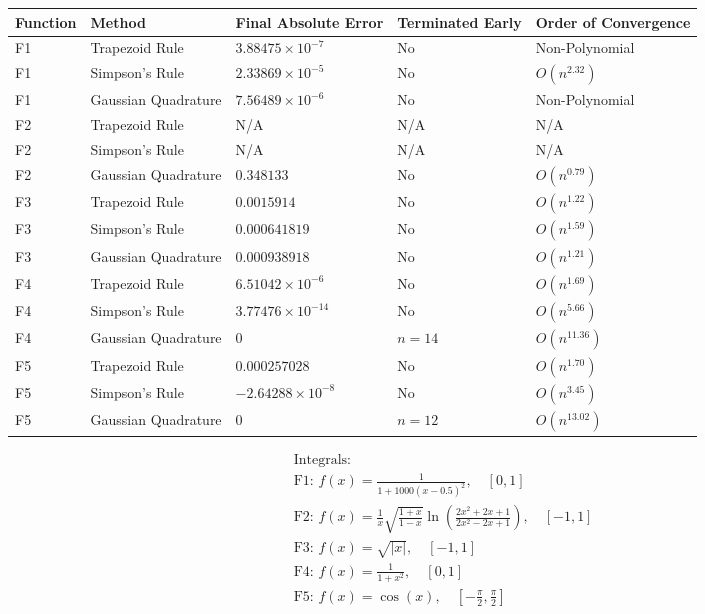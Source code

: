 \documentclass[12pt]{article}
\begin{document}
\begin{center}
	\begin{small}
	\begin{tabular}{| l | l | p{25mm} | p{17mm} | p{35mm} |}
		\hline
		Function & Method & Final Absolute Error & Terminated Early & Order of Convergence\\
		\hline
		F1 & Trapezoid Rule & $3.88475 \times 10^{-7}$ & No & Non-Polynomial\\
		\hline
		F1 & Simpson's Rule & $2.33869 \times 10^{-5}$ & No & $O(n^{2.32})$\\
		\hline
		F1 & Gaussian Quadrature & $7.56489 \times 10^{-6}$ & No & Non-Polynomial\\
		\hline
		F2 & Trapezoid Rule & N/A & N/A & N/A\\
		\hline
		F2 & Simpson's Rule & N/A & N/A & N/A\\
		\hline
		F2 & Gaussian Quadrature & $0.348133$ & No & $O(n^{0.79})$\\
		\hline
		F3 & Trapezoid Rule & $0.0015914$ & No & $O(n^{1.22})$\\
		\hline
		F3 & Simpson's Rule & $0.000641819$ & No & $O(n^{1.59})$\\
		\hline
		F3 & Gaussian Quadrature & $0.000938918$ & No & $O(n^{1.21})$\\
		\hline
		F4 & Trapezoid Rule & $6.51042 \times 10^{-6}$ & No & $O(n^{1.69})$\\
		\hline
		F4 & Simpson's Rule & $3.77476 \times 10^{-14}$ & No & $O(n^{5.66})$\\
		\hline
		F4 & Gaussian Quadrature & $0$ & $n = 14$ & $O(n^{11.36})$\\
		\hline
		F5 & Trapezoid Rule & $0.000257028$ & No & $O(n^{1.70})$\\
		\hline
		F5 & Simpson's Rule & $-2.64288 \times 10^{-8}$ & No & $O(n^{3.45})$\\
		\hline
		F5 & Gaussian Quadrature & $0$ & $n = 12$ & $O(n^{13.02})$\\
		\hline
	\end{tabular}
	\end{small}
\end{center}

\begin{align*}
	&\text{Integrals:}\\
	&\text{F1: }f(x) = \frac{1}{1 + 1000(x - 0.5)^2}, \quad [0, 1]\\
	&\text{F2: }f(x) = \frac{1}{x}\sqrt{\frac{1 + x}{1 - x}}\ln\left(\frac{2x^2 + 2x + 1}{2x^2 - 2x + 1}\right), \quad [-1, 1]\\
	&\text{F3: }f(x) = \sqrt{|x|}, \quad [-1, 1]\\
	&\text{F4: }f(x) = \frac{1}{1 + x^2}, \quad [0, 1]\\
	&\text{F5: }f(x) = \cos(x), \quad [-\frac{\pi}{2}, \frac{\pi}{2}]
\end{align*}
\end{document}
